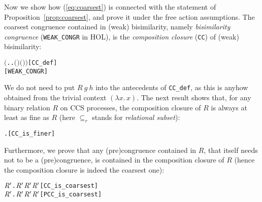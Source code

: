 Now we show how (\ref{eq:coarsest}) is connected with
the statement of Proposition~\ref{prop:coarsest}, and prove it under
the free action assumptions.
%
The coarsest congruence
contained in (weak) bisimilarity, namely \emph{bisimilarity
  congruence} (\texttt{WEAK_CONGR} in HOL), is
the \emph{composition closure} (\texttt{CC}) of (weak) bisimilarity:
\begin{alltt}
     \HOLTokenDefEquality{} \ensuremath{(}\HOLTokenLambda{} . \HOLSymConst{\HOLTokenForall{}}.   \HOLSymConst{\HOLTokenImp{}}  \ensuremath{(} \ensuremath{)} \ensuremath{(} \ensuremath{)}\ensuremath{)}\hfill{[CC_def]}
    \HOLTokenDefEquality{}  \hfill{[WEAK_CONGR]}
\end{alltt}
We do not need to put $R\ g\ h$ into the antecedents of
  \texttt{CC\_def}, as this is anyhow obtained from the trivial context $(\lambda x.\,x)$.
The next result shows that, for any binary relation $R$ 
on CCS processes, the composition closure of $R$ is always at least as
fine as $R$ (here $\subseteq_r$ stands for \emph{relational subset}):
\begin{alltt}
\HOLTokenTurnstile{} \HOLSymConst{\HOLTokenForall{}}.   \HOLSymConst{\HOLTokenRSubset{}} \hfill{[CC_is_finer]}
\end{alltt}
Furthermore, we prove that any (pre)congruence contained in $R$,
that itself needs not to be a (pre)congruence,
is contained in the composition closure of $R$
(hence the composition closure is indeed the coarsest one):
\begin{alltt}
\HOLTokenTurnstile{} \HOLSymConst{\HOLTokenForall{}} \ensuremath{\HOLBoundVar{R}\sp{\prime}}.  \ensuremath{\HOLBoundVar{R}\sp{\prime}} \HOLSymConst{\HOLTokenConj{}} \ensuremath{\HOLBoundVar{R}\sp{\prime}} \HOLSymConst{\HOLTokenRSubset{}}  \HOLSymConst{\HOLTokenImp{}} \ensuremath{\HOLBoundVar{R}\sp{\prime}} \HOLSymConst{\HOLTokenRSubset{}}  \hfill{[CC_is_coarsest]}
\HOLTokenTurnstile{} \HOLSymConst{\HOLTokenForall{}} \ensuremath{\HOLBoundVar{R}\sp{\prime}}.  \ensuremath{\HOLBoundVar{R}\sp{\prime}} \HOLSymConst{\HOLTokenConj{}} \ensuremath{\HOLBoundVar{R}\sp{\prime}} \HOLSymConst{\HOLTokenRSubset{}}  \HOLSymConst{\HOLTokenImp{}} \ensuremath{\HOLBoundVar{R}\sp{\prime}} \HOLSymConst{\HOLTokenRSubset{}}  \hfill{[PCC_is_coarsest]}
\end{alltt}


